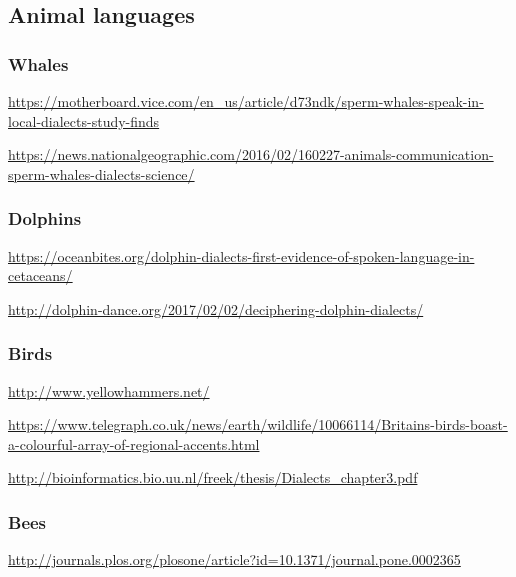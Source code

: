 \subsection{Animal languages}

\subsubsection{Whales}
\url{https://motherboard.vice.com/en_us/article/d73ndk/sperm-whales-speak-in-local-dialects-study-finds}

\url{https://news.nationalgeographic.com/2016/02/160227-animals-communication-sperm-whales-dialects-science/}

\subsubsection{Dolphins}
\url{https://oceanbites.org/dolphin-dialects-first-evidence-of-spoken-language-in-cetaceans/}

\url{http://dolphin-dance.org/2017/02/02/deciphering-dolphin-dialects/}

\subsubsection{Birds}
\url{http://www.yellowhammers.net/}

\url{https://www.telegraph.co.uk/news/earth/wildlife/10066114/Britains-birds-boast-a-colourful-array-of-regional-accents.html}

\url{http://bioinformatics.bio.uu.nl/freek/thesis/Dialects_chapter3.pdf}

\subsubsection{Bees}
\url{http://journals.plos.org/plosone/article?id=10.1371/journal.pone.0002365}
